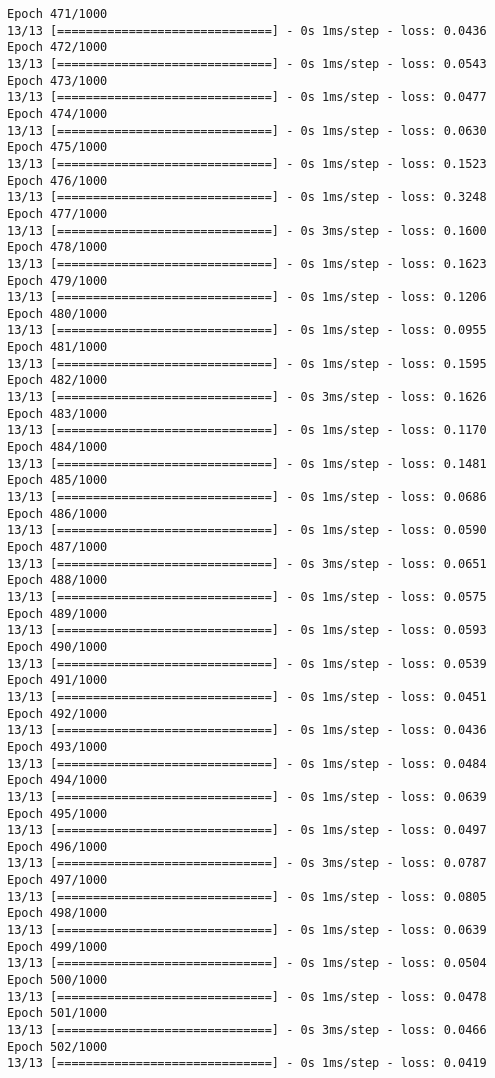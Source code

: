 \documentclass[11pt]{article}
\begin{document}
\begin{Verbatim}[commandchars=\\\{\}]
Epoch 471/1000
13/13 [==============================] - 0s 1ms/step - loss: 0.0436
Epoch 472/1000
13/13 [==============================] - 0s 1ms/step - loss: 0.0543
Epoch 473/1000
13/13 [==============================] - 0s 1ms/step - loss: 0.0477
Epoch 474/1000
13/13 [==============================] - 0s 1ms/step - loss: 0.0630
Epoch 475/1000
13/13 [==============================] - 0s 1ms/step - loss: 0.1523
Epoch 476/1000
13/13 [==============================] - 0s 1ms/step - loss: 0.3248
Epoch 477/1000
13/13 [==============================] - 0s 3ms/step - loss: 0.1600
Epoch 478/1000
13/13 [==============================] - 0s 1ms/step - loss: 0.1623
Epoch 479/1000
13/13 [==============================] - 0s 1ms/step - loss: 0.1206
Epoch 480/1000
13/13 [==============================] - 0s 1ms/step - loss: 0.0955
Epoch 481/1000
13/13 [==============================] - 0s 1ms/step - loss: 0.1595
Epoch 482/1000
13/13 [==============================] - 0s 3ms/step - loss: 0.1626
Epoch 483/1000
13/13 [==============================] - 0s 1ms/step - loss: 0.1170
Epoch 484/1000
13/13 [==============================] - 0s 1ms/step - loss: 0.1481
Epoch 485/1000
13/13 [==============================] - 0s 1ms/step - loss: 0.0686
Epoch 486/1000
13/13 [==============================] - 0s 1ms/step - loss: 0.0590
Epoch 487/1000
13/13 [==============================] - 0s 3ms/step - loss: 0.0651
Epoch 488/1000
13/13 [==============================] - 0s 1ms/step - loss: 0.0575
Epoch 489/1000
13/13 [==============================] - 0s 1ms/step - loss: 0.0593
Epoch 490/1000
13/13 [==============================] - 0s 1ms/step - loss: 0.0539
Epoch 491/1000
13/13 [==============================] - 0s 1ms/step - loss: 0.0451
Epoch 492/1000
13/13 [==============================] - 0s 1ms/step - loss: 0.0436
Epoch 493/1000
13/13 [==============================] - 0s 1ms/step - loss: 0.0484
Epoch 494/1000
13/13 [==============================] - 0s 1ms/step - loss: 0.0639
Epoch 495/1000
13/13 [==============================] - 0s 1ms/step - loss: 0.0497
Epoch 496/1000
13/13 [==============================] - 0s 3ms/step - loss: 0.0787
Epoch 497/1000
13/13 [==============================] - 0s 1ms/step - loss: 0.0805
Epoch 498/1000
13/13 [==============================] - 0s 1ms/step - loss: 0.0639
Epoch 499/1000
13/13 [==============================] - 0s 1ms/step - loss: 0.0504
Epoch 500/1000
13/13 [==============================] - 0s 1ms/step - loss: 0.0478
Epoch 501/1000
13/13 [==============================] - 0s 3ms/step - loss: 0.0466
Epoch 502/1000
13/13 [==============================] - 0s 1ms/step - loss: 0.0419

\end{Verbatim}
\end{document}
